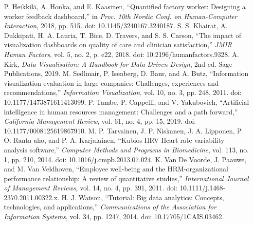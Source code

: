 \begin{thebibliography}{99}
 P. Heikkil\"a, A. Honka, and E. Kaasinen, \textquotedblleft Quantified factory worker: Designing a worker feedback dashboard,\textquotedblright{} in \emph{Proc. 10th Nordic Conf. on Human-Computer Interaction}, 2018, pp. 515. doi: 10.1145/3240167.3240187.
 S. S. Khairat, A. Dukkipati, H. A. Lauria, T. Bice, D. Travers, and S. S. Carson, \textquotedblleft The impact of visualization dashboards on quality of care and clinician satisfaction,\textquotedblright{} \emph{JMIR Human Factors}, vol. 5, no. 2, p. e22, 2018. doi: 10.2196/humanfactors.9328.
 A. Kirk, \emph{Data Visualisation: A Handbook for Data Driven Design}, 2nd ed. Sage Publications, 2019.
 M. Sedlmair, P. Isenberg, D. Baur, and A. Butz, \textquotedblleft Information visualization evaluation in large companies: Challenges, experiences and recommendations,\textquotedblright{} \emph{Information Visualization}, vol. 10, no. 3, pp. 248, 2011. doi: 10.1177/1473871611413099.
 P. Tambe, P. Cappelli, and V. Yakubovich, \textquotedblleft Artificial intelligence in human resources management: Challenges and a path forward,\textquotedblright{} \emph{California Management Review}, vol. 61, no. 4, pp. 15, 2019. doi: 10.1177/0008125619867910.
 M. P. Tarvainen, J. P. Niskanen, J. A. Lipponen, P. O. Ranta-aho, and P. A. Karjalainen, \textquotedblleft Kubios HRV \textendash Heart rate variability analysis software,\textquotedblright{} \emph{Computer Methods and Programs in Biomedicine}, vol. 113, no. 1, pp. 210, 2014. doi: 10.1016/j.cmpb.2013.07.024.
 K. Van De Voorde, J. Paauwe, and M. Van Veldhoven, \textquotedblleft Employee well-being and the HRM-organizational performance relationship: A review of quantitative studies,\textquotedblright{} \emph{International Journal of Management Reviews}, vol. 14, no. 4, pp. 391, 2011. doi: 10.1111/j.1468-2370.2011.00322.x.
 H. J. Watson, \textquotedblleft Tutorial: Big data analytics: Concepts, technologies, and applications,\textquotedblright{} \emph{Communications of the Association for Information Systems}, vol. 34, pp. 1247, 2014. doi: 10.17705/1CAIS.03462.
\end{thebibliography}
